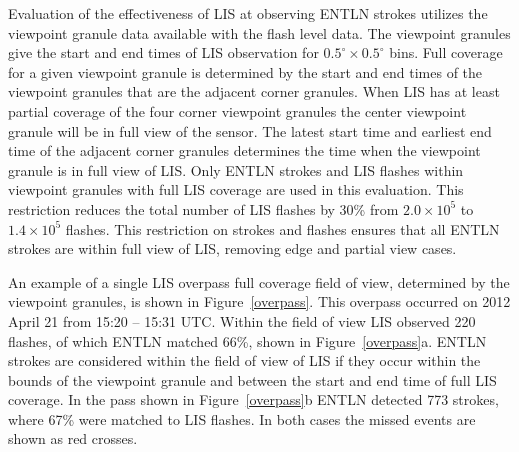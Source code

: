 Evaluation of the effectiveness of LIS at observing ENTLN strokes utilizes the viewpoint granule data available with the flash level data.
The viewpoint granules give the start and end times of LIS observation for $0.5^\circ \times 0.5^\circ$ bins.
Full coverage for a given viewpoint granule is determined by the start and end times of the viewpoint granules that are the adjacent corner granules.
When LIS has at least partial coverage of the four corner viewpoint granules the center viewpoint granule will be in full view of the sensor.
The latest start time and earliest end time of the adjacent corner granules determines the time when the viewpoint granule is in full view of LIS.
Only ENTLN strokes and LIS flashes within viewpoint granules with full LIS coverage are used in this evaluation.
This restriction reduces the total number of LIS flashes by 30\% from $2.0 \times 10^5$ to $1.4 \times 10^5$ flashes.
This restriction on strokes and flashes ensures that all ENTLN strokes are within full view of LIS, removing edge and partial view cases.

An example of a single LIS overpass full coverage field of view, determined by the viewpoint granules, is shown in Figure~\ref{overpass}.
This overpass occurred on 2012 April 21 from 15:20 -- 15:31 UTC.
Within the field of view LIS observed 220 flashes, of which ENTLN matched 66\%, shown in Figure~\ref{overpass}a.
ENTLN strokes are considered within the field of view of LIS if they occur within the bounds of the viewpoint granule and between the start and end time of full LIS coverage.
In the pass shown in Figure~\ref{overpass}b ENTLN detected 773 strokes, where 67\% were matched to LIS flashes.
In both cases the missed events are shown as red crosses.


